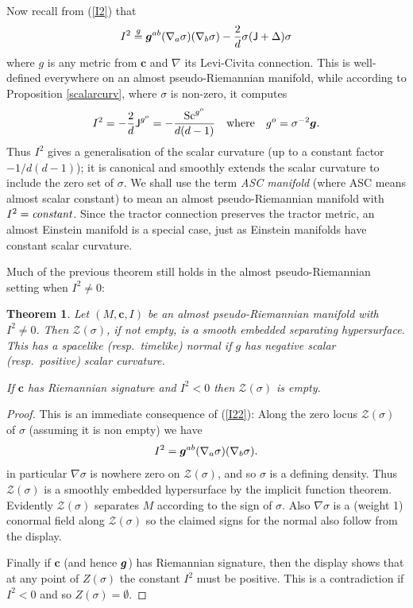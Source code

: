 \documentclass[a4paper,12pt]{amsart}
\newcommand{\cZ}{\mathcal{Z}}
\newcommand{\J}{\mbox{\sf J}}
\newcommand{\cc}{\boldsymbol{c}}
\def\bg{\mbox{\boldmath $g$}}
\newcommand{\si}{\sigma}
\newtheorem{theorem}{Theorem}[section]
\theoremstyle{remark}
\newcommand{\nn}[1]{(\ref{#1})}
\newcommand{\Sc}{\operatorname{Sc}}
\begin{document}
Now recall from \nn{I2} that 
\begin{equation}\label{I22}
I^2 \stackrel{g}{=} \bg^{ab}(\nabla_a \si)(\nabla_b \si) -
\frac{2}{d} \si (\J+\Delta )\si
\end{equation}
where $g$ is any metric from $\cc$ and $\nabla$ its Levi-Civita connection. 
This is well-defined everywhere on an almost pseudo-Riemannian manifold, while
according to Proposition \ref{scalarcurv}, where $\si$ is non-zero, it computes 
$$
I^2= -\frac{2}{d}\J^{g^o}= -\frac{\Sc^{g^o}}{d(d-1)} \quad \mbox{where} \quad g^o=\si^{-2}\bg .
$$ Thus $I^2$ gives a generalisation of the scalar curvature (up to a
constant factor $-1/d(d-1)$); it is canonical and smoothly extends the
scalar curvature to include the zero set of $\si$. We shall use the
term {\em ASC manifold} (where ASC means almost scalar constant) to
mean an almost pseudo-Riemannian manifold with
$I^2=\mbox{\it{constant}}$. Since the tractor connection preserves the
tractor metric, an almost Einstein manifold is a special case, just as
Einstein manifolds have constant scalar curvature.

Much of the previous theorem still holds in the almost pseudo-Riemannian setting when $I^2\neq 0$:
\begin{theorem}\label{APRthm} Let $(M,\cc,I)$ be an almost pseudo-Riemannian manifold with $I^2\neq 0$. Then $\cZ(\si)$, if not empty, is a smooth embedded separating hypersurface. This has a spacelike (resp.\ timelike) normal if $g$ has negative scalar (resp.\  positive) scalar curvature.

If $\cc$ has Riemannian signature and $I^2< 0$ then $\cZ(\si)$ is empty.
\end{theorem}
\begin{proof}
This is an immediate consequence of \nn{I22}: Along the zero locus $\cZ(\si)$ of $\si$ (assuming it is non empty) we have 
$$
I^2=\bg^{ab}(\nabla_a \si)(\nabla_b\si) .
$$ 
in particular $\nabla \si$ is nowhere zero on $\cZ(\si)$, and so $\si$ is a defining density. Thus $\cZ(\si)$ is a smoothly embedded hypersurface
by the implicit function theorem. Evidently $\cZ(\si)$ separates $M$ according to the sign of $\si$. Also $\nabla \si$ is a (weight 1) conormal field along $\cZ(\si)$ so the claimed signs for the normal also follow from the display. 

Finally if $\cc$ (and hence $\bg$) has Riemannian signature, then the
display shows that at any point of $Z(\si)$ the constant $I^2$ must be
positive. This is a contradiction if $I^2<0$ and so
$Z(\si)=\emptyset$.
\end{proof}
\end{document}
